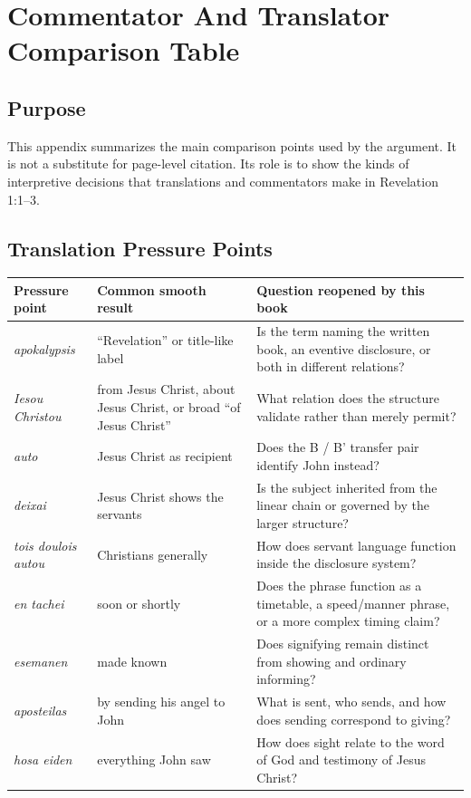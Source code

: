 \chapter{Commentator And Translator Comparison Table}

\section{Purpose}

This appendix summarizes the main comparison points used by the argument. It is not a substitute for page-level citation. Its role is to show the kinds of interpretive decisions that translations and commentators make in Revelation 1:1--3.

\section{Translation Pressure Points}

\begin{center}
\begin{longtable}{@{}L{0.2\textwidth}L{0.34\textwidth}L{0.34\textwidth}@{}}
\toprule
Pressure point & Common smooth result & Question reopened by this book \\
\midrule
\textit{apokalypsis} & ``Revelation'' or title-like label & Is the term naming the written book, an eventive disclosure, or both in different relations? \\
\textit{Iesou Christou} & from Jesus Christ, about Jesus Christ, or broad ``of Jesus Christ'' & What relation does the structure validate rather than merely permit? \\
\textit{auto} & Jesus Christ as recipient & Does the B / B' transfer pair identify John instead? \\
\textit{deixai} & Jesus Christ shows the servants & Is the subject inherited from the linear chain or governed by the larger structure? \\
\textit{tois doulois autou} & Christians generally & How does servant language function inside the disclosure system? \\
\textit{en tachei} & soon or shortly & Does the phrase function as a timetable, a speed/manner phrase, or a more complex timing claim? \\
\textit{esemanen} & made known & Does signifying remain distinct from showing and ordinary informing? \\
\textit{aposteilas} & by sending his angel to John & What is sent, who sends, and how does sending correspond to giving? \\
\textit{hosa eiden} & everything John saw & How does sight relate to the word of God and testimony of Jesus Christ? \\
\bottomrule
\end{longtable}
\end{center}

